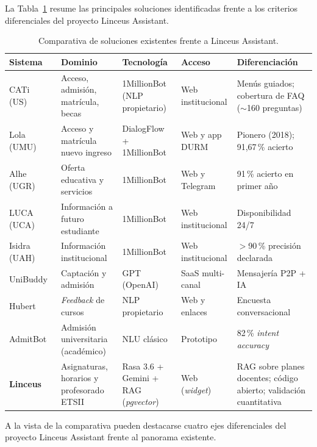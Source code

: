 La Tabla~\ref{tab:soluciones-comparativa} resume las principales soluciones identificadas frente a los criterios diferenciales del proyecto Linceus Assistant.

\begin{table}[hbtp]
\centering
\small
\caption{Comparativa de soluciones existentes frente a Linceus Assistant.}\label{tab:soluciones-comparativa}
\begin{tabular}{|p{2.4cm}|p{2.4cm}|p{2.4cm}|p{2.0cm}|p{2.6cm}|}
\hline
\rowcolor{black!10}
\textbf{Sistema} & \textbf{Dominio} & \textbf{Tecnología} & \textbf{Acceso} & \textbf{Diferenciación} \\
\hline
CATi (US)~\cite{usCati} & Acceso, admisión, matrícula, becas & 1MillionBot (NLP propietario) & Web institucional & Menús guiados; cobertura de FAQ ($\sim$160 preguntas) \\
\hline
Lola (UMU)~\cite{umuLola} & Acceso y matrícula nuevo ingreso & DialogFlow + 1MillionBot & Web y app DURM & Pionero (2018); 91,67\,\% acierto \\
\hline
Alhe (UGR)~\cite{ugrAlhe} & Oferta educativa y servicios & 1MillionBot & Web y Telegram & 91\,\% acierto en primer año \\
\hline
LUCA (UCA)~\cite{ucaLuca} & Información a futuro estudiante & 1MillionBot & Web institucional & Disponibilidad 24/7 \\
\hline
Isidra (UAH)~\cite{uahIsidra} & Información institucional & 1MillionBot & Web institucional & $>$90\,\% precisión declarada \\
\hline
UniBuddy~\cite{unibuddy} & Captación y admisión & GPT (OpenAI) & SaaS multi-canal & Mensajería P2P + IA \\
\hline
Hubert~\cite{hubert} & \textit{Feedback} de cursos & NLP propietario & Web y enlaces & Encuesta conversacional \\
\hline
AdmitBot~\cite{gupta2019admitbot} & Admisión universitaria (académico) & NLU clásico & Prototipo & 82\,\% \textit{intent accuracy} \\
\hline
\rowcolor{usteal!12}
\textbf{Linceus} & Asignaturas, horarios y profesorado ETSII & Rasa 3.6 + Gemini + RAG (\textit{pgvector}) & Web (\textit{widget}) & RAG sobre planes docentes; código abierto; validación cuantitativa \\
\hline
\end{tabular}
\end{table}

A la vista de la comparativa pueden destacarse cuatro ejes diferenciales del proyecto Linceus Assistant frente al panorama existente.

